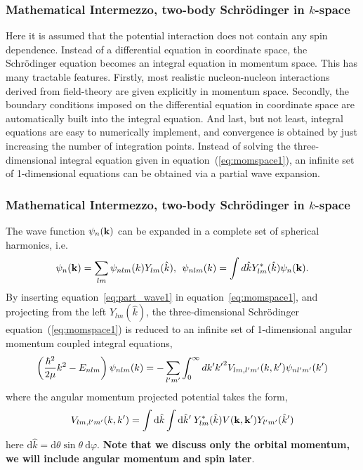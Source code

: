 \documentclass[compress]{beamer}
\begin{document}
\frame
{
\frametitle{Mathematical Intermezzo, two-body Schr\"odinger in $k$-space}
\begin{small}
{\scriptsize
Here it is assumed that the potential interaction does not contain any spin dependence. 
Instead of a differential equation in coordinate space, the Schr\"odinger
equation becomes an integral equation in momentum space. This has 
many tractable features. Firstly, most realistic 
nucleon-nucleon interactions derived from field-theory are given 
explicitly in momentum space. Secondly, the boundary conditions imposed
on the differential equation in coordinate space are automatically built into the
integral equation. And last, but not least, integral equations are easy to numerically 
implement, and convergence is obtained by just increasing the number of integration
points.
Instead of solving the three-dimensional integral equation given in equation~(\ref{eq:momspace1}), an 
infinite set of 1-dimensional equations can be obtained via a  partial wave
expansion. 
}
\end{small}
}



\frame
{
\frametitle{Mathematical Intermezzo, two-body Schr\"odinger in $k$-space}
\begin{small}
{\scriptsize
The wave function $ \psi_n({\bf k}) $ can be expanded in a complete set of spherical harmonics, i.e. 
\begin{equation}
  \psi_n({\bf k}) = \sum _{lm} \psi_{nlm}(k)Y_{lm} (\hat{k}), \:\:
  \psi_{nlm}(k) = \int d\hat{k} Y_{lm}^*(\hat{k})\psi_n({\bf k}).   
  \label{eq:part_wave1}
\end{equation}
By inserting equation~\ref{eq:part_wave1} in equation~\ref{eq:momspace1}, and projecting from the left
$Y_{lm}(\hat{k})$, the three-dimensional Schr\"odinger equation~(\ref{eq:momspace1}) is reduced
to an infinite set of  1-dimensional angular momentum coupled integral equations, 
\begin{equation}
  \left( {\hbar^2 \over 2\mu} k^2 - E_{nlm}\right) \psi_{nlm}(k) =  
  -\sum_{l'm'} \int_{0}^\infty dk' {k'}^2 V_{lm, l'm'}(k,k') \psi_{nl'm'}(k') 
  \label{eq:part_wave2}
\end{equation}
where the angular momentum projected potential takes the form,
\begin{equation}
  V_{lm, l'm'}(k,k') = \int \mathrm{d}{\hat{k}} \int \mathrm{d}{\hat{k}'}\: 
    Y_{lm}^*(\hat{k})V({\bf k}, {\bf k'})Y_{l'm'}(\hat{k}')
    \label{eq:pot1}
\end{equation}
here $\mathrm{d}{\hat k} = \mathrm{d}\theta \sin\theta \:\mathrm{d}\varphi $.
{\bf Note that we discuss only the orbital momentum, we will include angular momentum and spin later}. 
}
\end{small}
}
\end{document}
